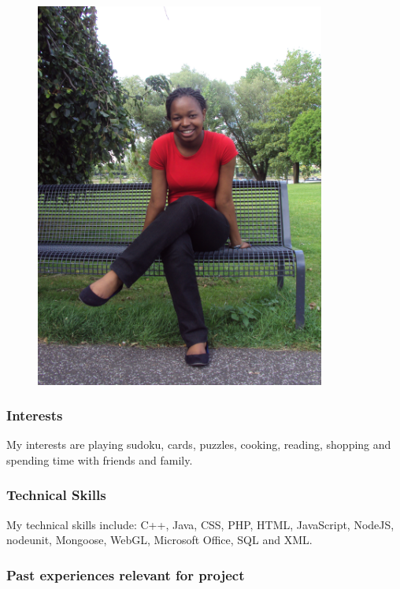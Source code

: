 \documentclass[hidelinks, 12pt, oneside]{article}
\begin{document}
\begin{figure}[ht!]
  \centering
    \includegraphics[width=0.85\textwidth]{Semaka} 
\end{figure}

\subsubsection{Interests}

My interests are playing sudoku, cards, puzzles, cooking, reading, shopping and spending time with friends and family.

\subsubsection{Technical Skills}

My technical skills include: C++, Java, CSS, PHP, HTML, JavaScript, NodeJS, nodeunit, Mongoose, WebGL, Microsoft Office, SQL and XML.
 
\subsubsection{Past experiences relevant for project}
\end{document}
